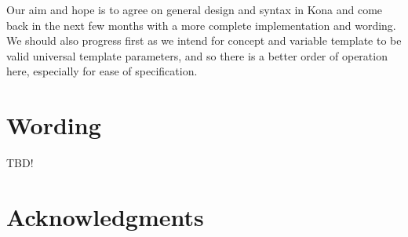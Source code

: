 \documentclass{wg21}
\begin{document}
Our aim and hope is to agree on general design and syntax in Kona and come back in the next few months with a more complete implementation and wording.
We should also progress  first as we intend for concept and variable template to be valid universal template parameters,
and so there is a better order of operation here, especially for ease of specification.

\section{Wording}

TBD!

\section{Acknowledgments}





\renewcommand{\section}[2]{}%

\begin{thebibliography}{9}


\end{thebibliography}
\end{document}
